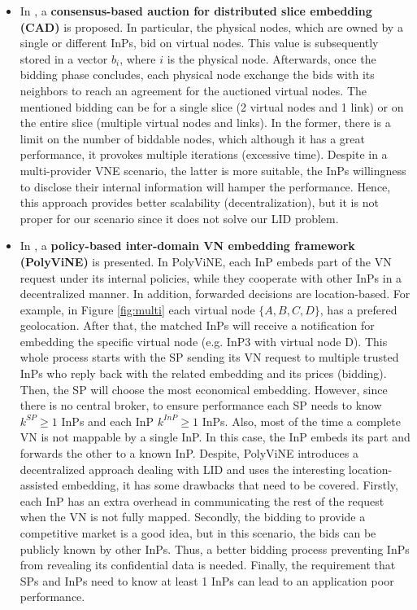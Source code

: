 \begin{itemize}
	\item In \citep{esposito2013general}, a \textbf{consensus-based auction for distributed slice embedding (CAD)} is proposed. In particular, the physical nodes, which are owned by a single or different InPs, bid on virtual nodes. This value is subsequently stored in a vector $b_i$, where $i$ is the physical node. Afterwards, once the bidding phase concludes, each physical node exchange the bids with its neighbors to reach an agreement for the auctioned virtual nodes. The mentioned bidding can be for a single slice (2 virtual nodes and 1 link) or on the entire slice (multiple virtual nodes and links). In the former, there is a limit on the number of biddable nodes, which although it has a great performance, it provokes multiple iterations (excessive time). Despite in a multi-provider VNE scenario, the latter is more suitable, the InPs willingness to disclose their internal information will hamper the performance. Hence, this approach provides better scalability (decentralization), but it is not proper for our scenario since it does not solve our LID problem.
	\item In \citep{chowdhury2010polyvine}, a \textbf{policy-based inter-domain VN embedding framework (PolyViNE)} is presented. In PolyViNE, each InP embeds part of the VN request under its internal policies, while they cooperate with other InPs in a decentralized manner. In addition, forwarded decisions are location-based. For example, in Figure \ref{fig:multi} each virtual node $\{A,B,C,D\}$, has a prefered geolocation. After that, the matched InPs will receive a notification for embedding the specific virtual node (e.g. InP3 with virtual node D). This whole process starts with the SP sending its VN request to multiple trusted InPs who reply back with the related embedding and its prices (bidding). Then, the SP will choose the most economical embedding. However, since there is no central broker, to ensure performance each SP needs to know $k^{SP} \geq 1$ InPs and each InP $k^{InP} \geq 1$ InPs. Also, most of the time a complete VN is not mappable by a single InP. In this case, the InP embeds its part and forwards the other to a known InP.
Despite, PolyViNE introduces a decentralized approach dealing with LID and uses the interesting location-assisted embedding, it has some drawbacks that need to be covered. Firstly, each InP has an extra overhead in communicating the rest of the request when the VN is not fully mapped. Secondly, the bidding to provide a competitive market is a good idea, but in this scenario, the bids can be publicly known by other InPs. Thus, a better bidding process preventing InPs from revealing its confidential data is needed. Finally, the requirement that SPs and InPs need to know at least 1 InPs can lead to an application poor performance.
	

\end{itemize}
